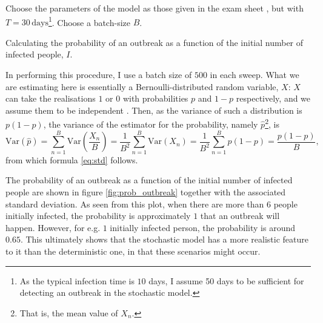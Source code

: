 \begin{algorithm}[H]
	Choose the parameters of the model as those given in the exam sheet \cite{sheet}, but with $T = 30 \, \mathrm{days}$\footnote{As the typical infection time is $10$ days, I assume 50 days to be sufficient for detecting an outbreak in the stochastic model.}. \;
	Choose a batch-size $B$.\;
	\caption{Calculating the probability of an outbreak as a function of the initial number of infected people, $I$. }
	\label{alg:prob_I}
\end{algorithm} 

In performing this procedure, I use a batch size of $500$ in each sweep. What we are estimating here is essentially a Bernoulli-distributed random variable, $X$: $X$ can take the realisations $1$ or $0$ with probabilities $p$ and $1-p$ respectively, and we assume them to be independent \cite[~p.26]{Wassermann}. Then, as the variance of such a distribution is $p(1-p)$, the variance of the estimator for the probability, namely $\hat{p}$\footnote{That is, the mean value of $X_n$.}, is 
$$
	\mathrm{Var}(\hat{p}) =  \sum_{n= 1}^{B} \mathrm{Var}\left(\frac{X_n}{B}\right) = \frac{1}{B^2} \sum_{n= 1}^{B} \mathrm{Var}(X_n) = \frac{1}{B^2} \sum_{n= 1}^{B} p (1-p) = \frac{p(1-p)}{B},
$$
from which formula \eqref{eq:std} follows. 

The probability of an outbreak as a function of the initial number of infected people are shown in figure \ref{fig:prob_outbreak} together with the associated standard deviation. As seen from this plot, when there are more than $6$ people initially infected, the probability is approximately $1$ that an outbreak will happen. However, for e.g. $1$ initially infected person, the probability is around $0.65$. This ultimately shows that the stochastic model has a more realistic feature to it than the deterministic one, in that these scenarios might occur.

